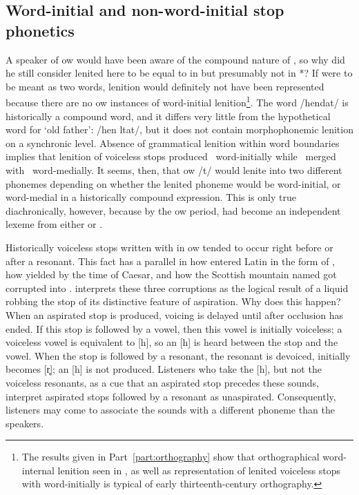 \subsection{Word-initial and non-word-initial stop phonetics}
\label{sec:word-initial-non}
A speaker of \gls{ow} would have been aware of the compound nature of , so why did he still consider lenited  here to be equal to  in  but presumably not in *? If  were to be meant  as two words, lenition would definitely not have been represented because there are no \gls{ow} instances of word-initial lenition\footnote{The results given in Part~\ref{part:orthography} show that orthographical word-internal lenition seen in , as well as representation of lenited voiceless stops with  word-initially is typical of early thirteenth-century orthography.}.  The word  /hendat/ is historically  a compound word, and it differs very little from the hypothetical word for `old father':  /hen \gls{l}tat/, but it does not contain morphophonemic lenition on a synchronic level. Absence of grammatical lenition within word boundaries implies that lenition of voiceless stops produced \lT\ word-initially while \lT\  merged with \xD\ word-medially. It seems, then, that \gls{ow} /t/ would lenite into two different phonemes depending on whether the lenited phoneme would be word-initial, or word-medial in a historically compound expression. This is only true diachronically, however, because by the \gls{ow} period,  had become an independent lexeme from either  or . 

Historically voiceless stops written with  in \gls{ow} tended to occur right before or after a resonant. This fact has a parallel in how  entered Latin in the form of , how  yielded  by the time of Caesar, and how the Scottish mountain named  got corrupted into . \textcite[§~25]{koch_*cothairche_1990} interprets these three corruptions as the logical result of a liquid robbing the stop of its distinctive feature of aspiration. Why does this happen? When an aspirated stop is produced, voicing is delayed until after occlusion has ended. If this stop is followed by a vowel, then this vowel is initially voiceless; a voiceless vowel is equivalent to [h], so an [h] is heard between the stop and the vowel. When the stop is followed by a resonant, the resonant is devoiced, \eg [r] initially becomes [r̥]; an [h] is not produced. Listeners who take the [h], but not the voiceless resonants, as a cue that an aspirated stop precedes these sounds, interpret aspirated stops followed by a resonant as unaspirated. Consequently, listeners may come to associate the sounds with a different \gls{phoneme} than the speakers.

